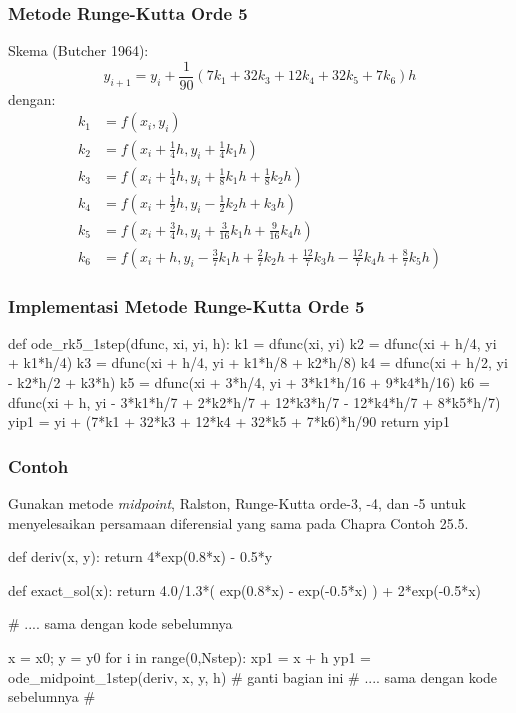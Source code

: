 \begin{frame}
\frametitle{Metode Runge-Kutta Orde 5}
\fontsize{9pt}{8.0}\selectfont

Skema (Butcher 1964):
\begin{equation*}
y_{i+1} = y_i + \frac{1}{90} ( 7 k_1 + 32 k_3 + 12 k_4 + 32 k_5 + 7 k_6) h
\end{equation*}
dengan:
\begin{align*}
k_1 & = f(x_i, y_i) \\
k_2 & = f\left( x_i + \frac{1}{4}h, y_i + \frac{1}{4} k_1 h \right) \\
k_3 & = f\left( x_i + \frac{1}{4}h, y_i + \frac{1}{8} k_1 h + \frac{1}{8} k_2 h \right) \\
k_4 & = f\left( x_i + \frac{1}{2}h, y_i - \frac{1}{2} k_2 h + k_3 h \right) \\
k_5 & = f\left( x_i + \frac{3}{4}h, y_i + \frac{3}{16} k_1 h + \frac{9}{16} k_4 h \right) \\
k_6 & = f\left( x_i + h, y_i - \frac{3}{7} k_1 h + \frac{2}{7} k_2 h +
\frac{12}{7}k_3 h - \frac{12}{7}k_4 h + \frac{8}{7}k_5 h \right)
\end{align*}

\end{frame}



\begin{frame}[fragile]
\frametitle{Implementasi Metode Runge-Kutta Orde 5}

\begin{pythoncode}
def ode_rk5_1step(dfunc, xi, yi, h):
    k1 = dfunc(xi, yi)
    k2 = dfunc(xi + h/4, yi + k1*h/4)
    k3 = dfunc(xi + h/4, yi + k1*h/8 + k2*h/8)
    k4 = dfunc(xi + h/2, yi - k2*h/2 + k3*h)
    k5 = dfunc(xi + 3*h/4, yi + 3*k1*h/16 + 9*k4*h/16)
    k6 = dfunc(xi + h, yi - 3*k1*h/7 + 2*k2*h/7 + 12*k3*h/7 - 12*k4*h/7 + 8*k5*h/7)
    yip1 = yi + (7*k1 + 32*k3 + 12*k4 + 32*k5 + 7*k6)*h/90
    return yip1
\end{pythoncode}

\end{frame}


\begin{frame}[fragile]
\frametitle{Contoh}

Gunakan metode \textit{midpoint}, Ralston, Runge-Kutta orde-3, -4, dan -5 untuk
menyelesaikan persamaan diferensial yang sama pada Chapra Contoh 25.5.

\begin{pythoncode}
def deriv(x, y):
    return 4*exp(0.8*x) - 0.5*y
    
def exact_sol(x):
    return 4.0/1.3*( exp(0.8*x) - exp(-0.5*x) ) + 2*exp(-0.5*x)

# .... sama dengan kode sebelumnya
    
x = x0; y = y0
for i in range(0,Nstep):
    xp1 = x + h
    yp1 = ode_midpoint_1step(deriv, x, y, h) # ganti bagian ini
# .... sama dengan kode sebelumnya
#
\end{pythoncode}

\end{frame}
